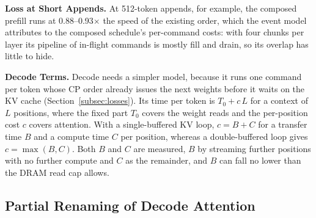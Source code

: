 \textbf{Loss at Short Appends.}
At 512-token appends, for example, the composed prefill runs at 0.88--0.93$\times$ the speed of the existing order, which the event model attributes to the composed schedule's per-command costs: with four chunks per layer its pipeline of in-flight commands is mostly fill and drain, so its overlap has little to hide.

\textbf{Decode Terms.}
Decode needs a simpler model, because it runs one command per token whose CP order already issues the next weights before it waits on the KV cache (Section~\ref{subsec:losses}).
Its time per token is $T_0 + c\,L$ for a context of $L$ positions, where the fixed part $T_0$ covers the weight reads and the per-position cost $c$ covers attention.
With a single-buffered KV loop, $c = B + C$ for a transfer time $B$ and a compute time $C$ per position, whereas a double-buffered loop gives $c = \max(B, C)$.
Both $B$ and $C$ are measured, $B$ by streaming further positions with no further compute and $C$ as the remainder, and $B$ can fall no lower than the DRAM read cap allows.


\subsection{Partial Renaming of Decode Attention}
\label{app:partial-rename}

